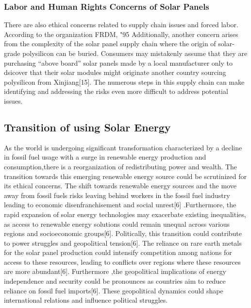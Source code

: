 \documentclass[10pt,twocolumn]{article}
\begin{document}
\subsubsection{Labor and Human Rights Concerns of Solar Panels}There are also ethical concerns related to supply chain issues and forced labor. According to the organization FRDM, "95%
Additionally, another concern arises from the complexity of the solar panel supply chain where the origin of solar-grade polysilicon can be buried. Consumers may mistakenly assume that they are purchasing “above board” solar panels made by a local manufacturer only to dsicover that their solar modules might originate another country sourcing polysilicon from Xinjiang[15]. The numerous steps in this supply chain can make identifying and addressing the risks even more difficult to address potential issues. 
\subsection{Transition of using Solar Energy}
As the world is undergoing significant transformation characterized by a decline in fossil fuel usage with a surge in renewable energy production and consumption,there is a reorganization of redistributing power and wealth. The transition towards this emerging renewable energy source could be scrutinized for its ethical concerns. The shift towards renewable energy sources and the move away from fossil fuels risks leaving behind workers in the fossil fuel industry leading to economic disenfranchisement and social unrest[6] .Furthermore, the rapid expansion of solar energy technologies may exacerbate existing inequalities, as access to renewable energy solutions could remain unequal across various regions and socioeconomic groups[6]. Politically, this transition could contribute to power struggles and geopolitical tension[6]. The reliance on rare earth metals for the solar panel production could intensify competition among nations for access to these resources, leading to conflicts over regions where these resources are more abundant[6]. Furthermore ,the geopolitical implications of energy independence and security could be pronounces as countries aim to reduce reliance on fossil fuel imports[6]. These geopolitical dynamics could shape international relations and influence political struggles. 
\end{document}
